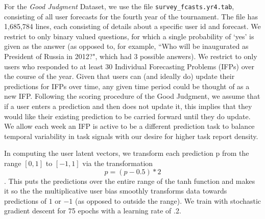 \documentclass{article}
\begin{document}



For the \emph{Good Judgment} Dataset, we use the file \texttt{survey\_fcasts.yr4.tab}, consisting of all user forecasts for the fourth year of the tournament. The file has 1,685,784 lines, each consisting of details about a specific user id and forecast. We restrict to only binary valued questions, for which a single probability of `yes' is given as the answer (as opposed to, for example, ``Who will be inaugurated as President of Russia in 2012?", which had 3 possible answers). We restrict to only users who responded to at least 30 Individual Forecasting Problems (IFPs) over the course of the year. Given that users can (and ideally do) update their predictions for IFPs over time, any given time period could be thought of as a new IFP. Following the scoring procedure of the Good Judgment, we assume that if a user enters a prediction and then does not update it, this implies that they would like their existing prediction to be carried forward until they do update. We allow each week an IFP is active to be a different prediction task to balance temporal variability in task signals with our desire for higher task report density.

In computing the user latent vectors, we transform each prediction p from the range $[0,1]$ to $[-1, 1]$ via the transformation $$p = (p - 0.5) * 2$$. This puts the predictions over the entire range of the tanh function and makes it so the the multiplicative user bias smoothly transforms data towards predictions of $1$ or $-1$ (as opposed to outside the range). We train with stochastic gradient descent for 75 epochs with a learning rate of .2. 
\end{document}
